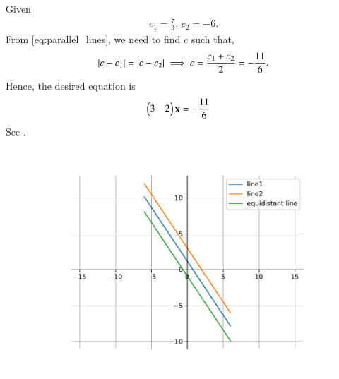 Given
\begin{align}
	c_1 = \frac{7}{3},\,
c_2 = -6.
\end{align}
	From \eqref{eq:parallel_lines},
we need to find $c$ such that,
\begin{align}
	\left\vert c-c_1\right\vert = \left\vert c-c_2\right\vert \implies c = \frac{c_1+c_2}{2}
	 = -\frac{11}{6}.
\end{align}
Hence, the desired equation is
\begin{align}
	\begin{pmatrix}3 & 2\end{pmatrix}\mathbf{x} &= -\frac{11}{6}
\end{align}
	See .
\begin{figure}[H]
	\centering
	\includegraphics[width=0.75\columnwidth]{chapters/11/10/4/21/figs/fig.pdf}
	\caption{}
	\label{fig:chapters/11/10/4/21/1}
\end{figure}
